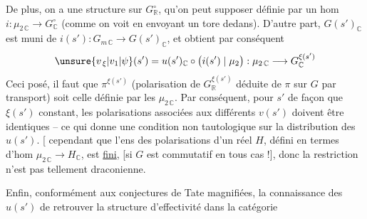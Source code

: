 De plus, on a une structure \inserted{ $\pi$} sur $G_{\mathbb{R}}^{\circ}$, qu'on peut  supposer définie par un hom  $i:\mu_{2\,\mathbb{C}}\longrightarrow G_{\mathbb{C}}^{\circ}$ (comme on voit en envoyant un tore  dedans). D'autre part, $G(s')_{\mathbb{C}}$ est muni de $i(s'):G_{m\,\mathbb{C}}\to G(s')_{\mathbb{C}}$, et  obtient par conséquent
\[
\unsure{v_{\,\xi}|v_{1}|\psi}(s')=u(s')_{\mathbb{C}}\circ\bigl(i(s')\mid\mu_2\bigr):\mu_{2\,\mathbb{C}}\longrightarrow G_{\mathbb{C}}^{\xi(s')}
\]
 Ceci posé, il faut que $\pi^{\xi(s')}$ (polarisation de $G_{\mathbb{R}}^{\xi(s')}$ déduite de $\pi$ sur $G$ par transport) soit celle définie par les $\mu_{2\,\mathbb{C}}$. Par conséquent, pour $s'$  de façon que $\xi(s')$  constant, les polarisations  associées aux différents $v(s')$ doivent être identiques -- ce qui donne une condition non tautologique sur la distribution des  $u(s')$. [ cependant que l'ens des  polarisations d'un  réel $H$, défini en termes d'hom $\mu_{2\,\mathbb{C}}\to H_{\mathbb{C}}$,  est \uline{fini}, [si $G$ est commutatif en tous cas !], donc la restriction n'est pas tellement draconienne.

Enfin, conformément aux conjectures de Tate magnifiées, la connaissance des $u(s')$  de retrouver la structure d'effectivité dans la catégorie
